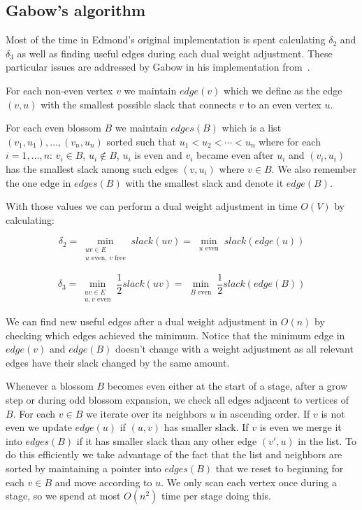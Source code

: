 \subsection{Gabow's algorithm}

Most of the time in Edmond's original implementation is spent calculating $\delta_2$ and $\delta_3$ as well as finding useful edges during each dual weight adjustment. These particular issues are addressed by Gabow in his implementation from~\cite{gabow1974implementation}.

For each non-even vertex $v$ we maintain $edge(v)$ which we define as the edge $(v, u)$ with the smallest possible slack that connects $v$ to an even vertex $u$.

For each even blossom $B$ we maintain $edges(B)$ which is a list $(v_1, u_1), \dots, (v_n, u_n)$ sorted such that $u_1 < u_2 < \cdots < u_n$ where for each $i = 1, \dots, n$: $v_i \in B$, $u_i \notin B$, $u_i$ is even and $v_i$ became even after $u_i$ and $(v_i, u_i)$ has the smallest slack among such edges $(v, u_i)$ where $v \in B$. We also remember the one edge in $edges(B)$ with the smallest slack and denote it $edge(B)$.

With those values we can perform a dual weight adjustment in time $O(V)$ by calculating:

\[\delta_2=\min_{\substack{uv\in E \\ \text{$u$ even, $v$ free}}} slack(uv) = \min_{\substack{u \text{ even}}} slack(edge(u))\] 

\[\delta_3=\min_{\substack{uv\in E \\ \text{$u, v$ even}}} \frac{1}{2}slack(uv) = \min_{\substack{B \text{ even}}} \frac{1}{2}slack(edge(B))\] 

We can find new useful edges after a dual weight adjustment in $O(n)$ by checking which edges achieved the minimum. Notice that the minimum edge in $edge(v)$ and $edge(B)$ doesn't change with a weight adjustment as all relevant edges have their slack changed by the same amount.

Whenever a blossom $B$ becomes even either at the start of a stage, after a grow step or during odd blossom expansion, we check all edges adjacent to vertices of $B$. For each $v \in B$ we iterate over its neighbors $u$ in ascending order. If $v$ is not even we update $edge(u)$ if $(u, v)$ has smaller slack. If $v$ is even we merge it into $edges(B)$ if it has smaller slack than any other edge $(v', u)$ in the list. To do this efficiently we take advantage of the fact that the list and neighbors are sorted by maintaining a pointer into $edges(B)$ that we reset to beginning for each $v \in B$ and move according to $u$. We only scan each vertex once during a stage, so we spend at most $O(n^2)$ time per stage doing this.

